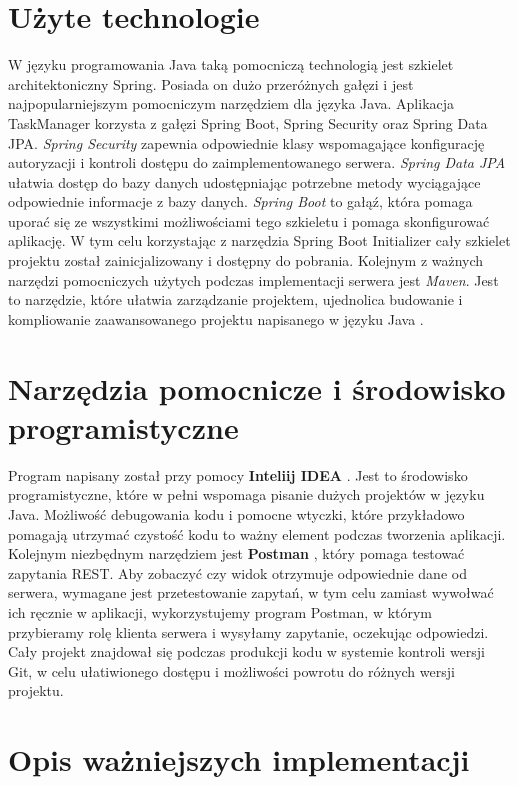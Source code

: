 \section{Użyte technologie}
W języku programowania Java taką pomocniczą technologią jest szkielet architektoniczny  Spring. Posiada on dużo przeróżnych gałęzi i jest najpopularniejszym pomocniczym narzędziem dla języka Java. Aplikacja TaskManager korzysta z gałęzi Spring Boot, Spring Security oraz Spring Data JPA. 
 \textit{Spring Security} zapewnia odpowiednie klasy wspomagające konfigurację autoryzacji i kontroli dostępu do zaimplementowanego serwera.  \textit{Spring Data JPA} ułatwia dostęp do bazy danych udostępniając potrzebne metody wyciągające odpowiednie informacje z bazy danych.\cite{SpringData} \cite{SpringSecurity}
 \textit{Spring Boot} to gałąź, która pomaga uporać się ze wszystkimi możliwościami tego szkieletu i pomaga skonfigurować aplikację. 
 W tym celu korzystając z narzędzia Spring Boot Initializer \cite{SpringInitializr} cały szkielet projektu został zainicjalizowany i dostępny do pobrania.
Kolejnym z ważnych  narzędzi pomocniczych użytych podczas implementacji serwera jest \textit{ Maven}. Jest to narzędzie, które ułatwia zarządzanie projektem, ujednolica budowanie i kompliowanie zaawansowanego projektu napisanego w języku Java \cite{ApacheMavenProject}. 

\section{Narzędzia pomocnicze i środowisko programistyczne }
Program napisany został przy pomocy \textbf{Inteliij IDEA} . Jest to środowisko programistyczne, które w pełni wspomaga pisanie dużych projektów w języku Java. Możliwość debugowania kodu i pomocne wtyczki, które przykładowo pomagają utrzymać czystość kodu to ważny element podczas tworzenia aplikacji.
Kolejnym niezbędnym narzędziem jest \textbf{Postman }, który pomaga testować zapytania REST. Aby zobaczyć czy widok otrzymuje odpowiednie dane od serwera, wymagane jest przetestowanie zapytań, w tym celu zamiast wywołwać ich ręcznie w aplikacji, wykorzystujemy program Postman, w którym przybieramy rolę klienta serwera i wysyłamy zapytanie, oczekując odpowiedzi. \cite{Postman}
Cały projekt znajdował się podczas produkcji kodu w systemie kontroli wersji Git, w celu ułatiwionego dostępu i możliwości powrotu do różnych wersji projektu.\cite{git}

	
\section{Opis ważniejszych  implementacji}

